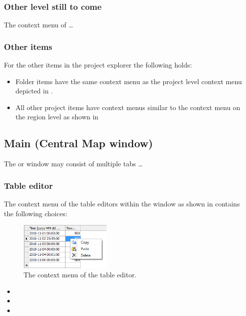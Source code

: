 \subsubsection{Other level still to come}
\label{subsubsec:otherLevel1}
The context menu of \ldots 
%
\subsubsection{Other items}
\label{subsubsec:otheritems}
For the other items in the project explorer the following holds:
\begin{itemize}
	\item Folder items have the same context menu as the project level context menu depicted in .
	\item All other project items have context menus similar to the context menu on the region level as shown in  
\end{itemize}

\subsection{Main (Central Map window)}
\label{subsec:centralmap}
The  or  window may consist of multiple tabs \ldots

\subsubsection{Table editor}
\label{subsubsec:tableeditor}
The context menu of the table editors within the  window as shown in  contains the following choices: 
%
\begin{figure} [H]
	\centering
		\includegraphics[width=0.4\textwidth]{Figures/Chapter_overview/context_menu_table.png}
	\caption{The context menu of the table editor.}
	\label{fig:contextmenutable}
\end{figure}
\begin{itemize}
	\item {}
	\item {}
	\item {}
\end{itemize}
